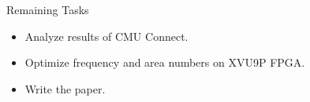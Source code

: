 \documentclass{beamer}
\begin{document}
        \begin{frame}{Remaining Tasks}
        \pause
            \begin{itemize}
                \item Analyze results of CMU Connect.
                \pause 
                \item Optimize frequency and area numbers on XVU9P FPGA.
                \pause
                \item Write the paper.
            \end{itemize}
        \end{frame} 
        
\end{document}
